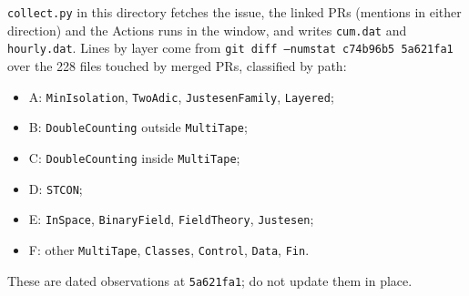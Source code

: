 \documentclass[11pt]{article}
\newcommand{\code}[1]{\texttt{\small #1}}
\begin{document}
\code{collect.py} in this directory fetches the issue, the linked PRs (mentions in either
direction) and the Actions runs in the window, and writes \code{cum.dat} and \code{hourly.dat}.
Lines by layer come from \code{git diff --numstat c74b96b5 5a621fa1} over the 228 files touched
by merged PRs, classified by path:
\begin{itemize}
\item A: \code{MinIsolation}, \code{TwoAdic}, \code{JustesenFamily}, \code{Layered};
\item B: \code{DoubleCounting} outside \code{MultiTape};
\item C: \code{DoubleCounting} inside \code{MultiTape};
\item D: \code{STCON};
\item E: \code{InSpace}, \code{BinaryField}, \code{FieldTheory}, \code{Justesen};
\item F: other \code{MultiTape}, \code{Classes}, \code{Control}, \code{Data}, \code{Fin}.
\end{itemize}
These are dated observations at \code{5a621fa1}; do not update them in place.
\end{document}
